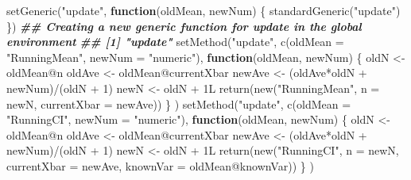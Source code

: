 \documentclass[
  12pt,
  krantz2]{krantz}
\makeatletter
\newenvironment{Shaded}{\begin{snugshade}}{\end{snugshade}}
\newcommand{\AttributeTok}[1]{\textcolor[rgb]{0.61,0.61,0.61}{#1}}
\newcommand{\ControlFlowTok}[1]{\textcolor[rgb]{0.27,0.27,0.27}{\textbf{#1}}}
\newcommand{\DecValTok}[1]{\textcolor[rgb]{0.06,0.06,0.06}{#1}}
\newcommand{\DocumentationTok}[1]{\textcolor[rgb]{0.37,0.37,0.37}{\textbf{\textit{#1}}}}
\newcommand{\FunctionTok}[1]{\textcolor[rgb]{0,0,0}{#1}}
\newcommand{\NormalTok}[1]{#1}
\newcommand{\OtherTok}[1]{\textcolor[rgb]{0.37,0.37,0.37}{#1}}
\newcommand{\SpecialCharTok}[1]{\textcolor[rgb]{0,0,0}{#1}}
\newcommand{\StringTok}[1]{\textcolor[rgb]{0.5,0.5,0.5}{#1}}
\newenvironment{kframe}{%
\medskip{}
\setlength{\fboxsep}{.8em}
 \def\at@end@of@kframe{}%
 \ifinner\ifhmode%
  \def\at@end@of@kframe{\end{minipage}}%
  \begin{minipage}{\columnwidth}%
 \fi\fi%
 \def\FrameCommand##1{\hskip\@totalleftmargin \hskip-\fboxsep
 \colorbox{shadecolor}{##1}\hskip-\fboxsep
     \hskip-\linewidth \hskip-\@totalleftmargin \hskip\columnwidth}%
 \MakeFramed {\advance\hsize-\width
   \@totalleftmargin\z@ \linewidth\hsize
   \@setminipage}}%
 {\par\unskip\endMakeFramed%
 \at@end@of@kframe}
\renewenvironment{Shaded}{\begin{kframe}}{\end{kframe}}
\makeatother
\begin{document}
\begin{Shaded}
\begin{Highlighting}[]
\FunctionTok{setGeneric}\NormalTok{(}\StringTok{"update"}\NormalTok{, }\ControlFlowTok{function}\NormalTok{(oldMean, newNum) \{}
  \FunctionTok{standardGeneric}\NormalTok{(}\StringTok{"update"}\NormalTok{)}
\NormalTok{\})}
\DocumentationTok{\#\# Creating a new generic function for \textquotesingle{}update\textquotesingle{} in the global environment}
\DocumentationTok{\#\# [1] "update"}
\FunctionTok{setMethod}\NormalTok{(}\StringTok{"update"}\NormalTok{,}
          \FunctionTok{c}\NormalTok{(}\AttributeTok{oldMean =} \StringTok{"RunningMean"}\NormalTok{, }\AttributeTok{newNum =} \StringTok{"numeric"}\NormalTok{),}
          \ControlFlowTok{function}\NormalTok{(oldMean, newNum) \{}
\NormalTok{            oldN }\OtherTok{\textless{}{-}}\NormalTok{ oldMean}\SpecialCharTok{@}\NormalTok{n}
\NormalTok{            oldAve }\OtherTok{\textless{}{-}}\NormalTok{ oldMean}\SpecialCharTok{@}\NormalTok{currentXbar}
\NormalTok{            newAve }\OtherTok{\textless{}{-}}\NormalTok{ (oldAve}\SpecialCharTok{*}\NormalTok{oldN }\SpecialCharTok{+}\NormalTok{ newNum)}\SpecialCharTok{/}\NormalTok{(oldN }\SpecialCharTok{+} \DecValTok{1}\NormalTok{)}
\NormalTok{            newN }\OtherTok{\textless{}{-}}\NormalTok{ oldN }\SpecialCharTok{+}\NormalTok{ 1L}
            \FunctionTok{return}\NormalTok{(}\FunctionTok{new}\NormalTok{(}\StringTok{"RunningMean"}\NormalTok{, }\AttributeTok{n =}\NormalTok{ newN, }\AttributeTok{currentXbar =}\NormalTok{ newAve))}
\NormalTok{          \}}
\NormalTok{)}
\FunctionTok{setMethod}\NormalTok{(}\StringTok{"update"}\NormalTok{,}
          \FunctionTok{c}\NormalTok{(}\AttributeTok{oldMean =} \StringTok{"RunningCI"}\NormalTok{, }\AttributeTok{newNum =} \StringTok{"numeric"}\NormalTok{),}
          \ControlFlowTok{function}\NormalTok{(oldMean, newNum) \{}
\NormalTok{            oldN }\OtherTok{\textless{}{-}}\NormalTok{ oldMean}\SpecialCharTok{@}\NormalTok{n}
\NormalTok{            oldAve }\OtherTok{\textless{}{-}}\NormalTok{ oldMean}\SpecialCharTok{@}\NormalTok{currentXbar}
\NormalTok{            newAve }\OtherTok{\textless{}{-}}\NormalTok{ (oldAve}\SpecialCharTok{*}\NormalTok{oldN }\SpecialCharTok{+}\NormalTok{ newNum)}\SpecialCharTok{/}\NormalTok{(oldN }\SpecialCharTok{+} \DecValTok{1}\NormalTok{)}
\NormalTok{            newN }\OtherTok{\textless{}{-}}\NormalTok{ oldN }\SpecialCharTok{+}\NormalTok{ 1L}
            \FunctionTok{return}\NormalTok{(}\FunctionTok{new}\NormalTok{(}\StringTok{"RunningCI"}\NormalTok{, }\AttributeTok{n =}\NormalTok{ newN, }\AttributeTok{currentXbar =}\NormalTok{ newAve, }\AttributeTok{knownVar =}\NormalTok{ oldMean}\SpecialCharTok{@}\NormalTok{knownVar))}
\NormalTok{          \}}
\NormalTok{)}
\end{Highlighting}
\end{Shaded}
\end{document}
